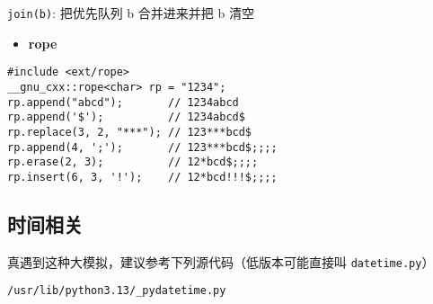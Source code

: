 \documentclass[a4paper,landscape,twocolumn]{ctexart}
\newcommand{\point}[1]{
	\begin{itemize}
		\item \textbf{#1}
	\end{itemize}
}
\begin{document}
\texttt{join(b)}: 把优先队列 b 合并进来并把 b 清空

\point{rope}

\begin{lstlisting}
#include <ext/rope>
__gnu_cxx::rope<char> rp = "1234";
rp.append("abcd");       // 1234abcd
rp.append('$');          // 1234abcd$
rp.replace(3, 2, "***"); // 123***bcd$
rp.append(4, ';');       // 123***bcd$;;;;
rp.erase(2, 3);          // 12*bcd$;;;;
rp.insert(6, 3, '!');    // 12*bcd!!!$;;;;
\end{lstlisting}

\subsection{时间相关}

真遇到这种大模拟，建议参考下列源代码（低版本可能直接叫 \texttt{datetime.py}）

\texttt{/usr/lib/python3.13/\_pydatetime.py}

%
\end{document}
